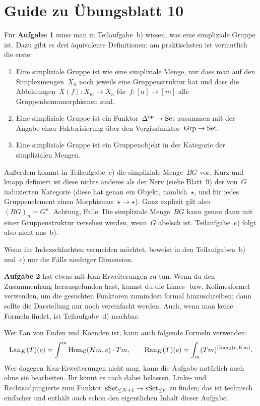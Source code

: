 \documentclass{uebblatt}
\begin{document}
\section*{Guide zu Übungsblatt 10}

Für \textbf{Aufgabe 1} muss man in Teilaufgabe~b) wissen, was eine simpliziale
Gruppe ist. Dazu gibt es drei äquivalente Definitionen; am praktischsten ist
vermutlich die erste:
\begin{enumerate}
\item Eine simpliziale Gruppe ist wie eine simpliziale Menge, nur dass man auf
den Simplexmengen~$X_n$ noch jeweils eine Gruppenstruktur hat und dass die
Abbildungen~$X(f) : X_m \to X_n$ für~$f : [n] \to [m]$ alle
Gruppenhomomorphismen sind.
\item Eine simpliziale Gruppe ist ein Funktor~$\Delta^{\mathrm{op}} \to \mathrm{Set}$ zusammen
mit der Angabe einer Faktorisierung über den Vergissfunktor~$\mathrm{Grp} \to \mathrm{Set}$.
\item Eine simpliziale Gruppe ist ein Gruppenobjekt in der Kategorie der
simplizialen Mengen.
\end{enumerate}

Außerdem kommt in Teilaufgabe~c) die simpliziale Menge~$BG$ vor. Kurz und knapp
definiert ist diese nichts anderes als der Nerv (siehe Blatt~9) der von~$G$
induzierten Kategorie (diese hat genau ein Objekt, nämlich~$\star$, und für
jedes Gruppenelement einen Morphismus~$\star \to \star$). Ganz explizit gilt
also~$(BG)_n = G^n$. Achtung, Falle: Die simpliziale Menge~$BG$ kann genau dann
mit einer Gruppenstruktur versehen werden, wenn~$G$ abelsch ist. Teilaufgabe~c)
folgt also nicht aus~b).

Wenn ihr Indexschlachten vermeiden möchtet, beweist in den Teilaufgaben~b)
und~c) nur die Fälle niedriger Dimension.

\textbf{Aufgabe 2} hat etwas mit Kan-Erweiterungen zu tun. Wenn du den
Zusammenhang herausgefunden hast, kannst du die Limes- bzw. Kolimesformel
verwenden, um die gesuchten Funktoren zumindest formal hinzuschreiben; dann
sollte die Darstellung nur noch vereinfacht werden. Auch, wenn man keine
Formeln findet, ist Teilaufgabe~d) machbar.

Wer Fan von Enden und Koenden ist, kann auch folgende Formeln verwenden:
\[ \mathrm{Lan}_K(T)(c) = \int^m \mathrm{Hom}_{\mathcal{C}}(Km,c) \cdot Tm, \qquad
  \mathrm{Ran}_K(T)(c) = \int_m (Tm)^{\mathrm{Hom}_{\mathcal{C}}(c,Km)}. \]
Wer dagegen Kan-Erweiterungen nicht mag, kann die Aufgabe natürlich auch
ohne sie bearbeiten. Ihr könnt es auch dabei belassen, Links- und
Rechtsadjungierte zum Funktor~$\mathrm{sSet}_{\leq N+1} \to \mathrm{sSet}_{\leq n}$ zu finden;
das ist technisch einfacher und enthält auch schon den eigentlichen Inhalt
dieser Aufgabe.
\end{document}
